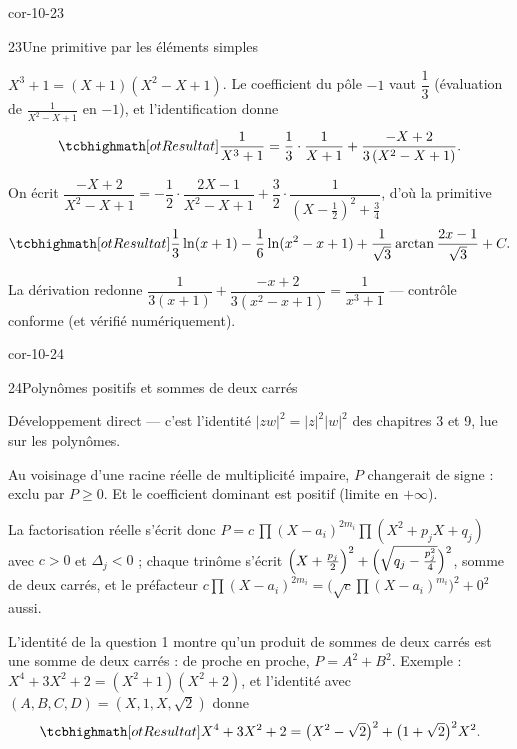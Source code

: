 \begin{blocLivre}{cor-10-23}
\begin{corrige}{23}{Une primitive par les éléments simples}
\begin{questions}
  \item $X^{3}+1=(X+1)(X^{2}-X+1)$. Le coefficient du pôle $-1$ vaut
    $\dfrac{1}{3}$ (évaluation de $\frac{1}{X^{2}-X+1}$ en $-1$), et
    l'identification donne
    \[
      \res{\frac{1}{X^{3}+1}=\frac{1}{3}\cdot\frac{1}{X+1}
      +\frac{-X+2}{3\,(X^{2}-X+1)}}.
    \]
  \item On écrit $\dfrac{-X+2}{X^{2}-X+1}
    =-\dfrac12\cdot\dfrac{2X-1}{X^{2}-X+1}
    +\dfrac32\cdot\dfrac{1}{(X-\frac12)^{2}+\frac34}$, d'où la primitive
    \[
      \res{\frac13\ln(x+1)-\frac16\ln(x^{2}-x+1)
      +\frac{1}{\sqrt3}\arctan\frac{2x-1}{\sqrt3}}+C.
    \]
  \item La dérivation redonne
    $\dfrac{1}{3(x+1)}+\dfrac{-x+2}{3(x^{2}-x+1)}=\dfrac{1}{x^{3}+1}$ —
    contrôle conforme (et vérifié numériquement).
\end{questions}
\end{corrige}
\end{blocLivre}

\begin{blocLivre}{cor-10-24}
\begin{corrige}{24}{Polynômes positifs et sommes de deux carrés}
\begin{questions}
  \item Développement direct — c'est l'identité
    $|zw|^{2}=|z|^{2}|w|^{2}$ des chapitres 3 et 9, lue sur les
    polynômes.
  \item Au voisinage d'une racine réelle de multiplicité impaire, $P$
    changerait de signe : exclu par $P\geq0$. Et le coefficient dominant
    est positif (limite en $+\infty$).
  \item La factorisation réelle s'écrit donc
    $P=c\,\prod(X-a_i)^{2m_i}\prod(X^{2}+p_jX+q_j)$ avec $c>0$ et
    $\Delta_j<0$ ; chaque trinôme s'écrit
    $\Bigl(X+\frac{p_j}{2}\Bigr)^{2}+\Bigl(\sqrt{q_j-\frac{p_j^{2}}{4}}\Bigr)^{2}$,
    somme de deux carrés, et le préfacteur
    $c\prod(X-a_i)^{2m_i}=\bigl(\sqrt c\prod(X-a_i)^{m_i}\bigr)^{2}+0^{2}$
    aussi.
  \item L'identité de la question 1 montre qu'un produit de sommes de
    deux carrés est une somme de deux carrés : de proche en proche,
    $P=A^{2}+B^{2}$. Exemple :
    $X^{4}+3X^{2}+2=(X^{2}+1)(X^{2}+2)$, et l'identité avec
    $(A,B,C,D)=(X,1,X,\sqrt2)$ donne
    \[
      \res{X^{4}+3X^{2}+2=\bigl(X^{2}-\sqrt2\bigr)^{2}
      +\bigl(1+\sqrt2\bigr)^{2}X^{2}}.
    \]
\end{questions}
\end{corrige}
\end{blocLivre}


